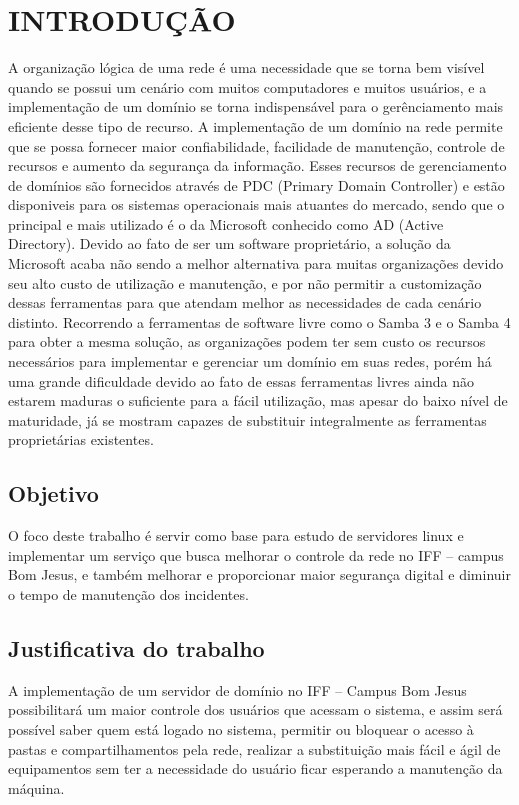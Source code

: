 \chapter{INTRODUÇÃO}

A organização lógica de uma rede é uma necessidade que se torna bem visível quando se possui um cenário com muitos computadores e muitos usuários, e a implementação de um domínio se torna indispensável para o gerênciamento mais eficiente desse tipo de recurso. A implementação de um domínio na rede permite que se possa fornecer maior confiabilidade, facilidade de manutenção, controle de recursos e aumento da segurança da informação.
Esses recursos de gerenciamento de domínios são fornecidos através de PDC (Primary Domain Controller) e estão disponiveis para os sistemas operacionais mais atuantes do mercado, sendo que o principal e mais utilizado é o da Microsoft conhecido como AD (Active Directory).
Devido ao fato de ser um software proprietário, a solução da Microsoft acaba não sendo a melhor alternativa para muitas organizações devido seu alto custo de utilização e manutenção, e por não permitir a customização dessas ferramentas para que atendam melhor as necessidades de cada cenário distinto.
Recorrendo a ferramentas de software livre como o Samba 3 e o Samba 4 para obter a mesma solução, as organizações podem ter sem custo os recursos necessários para implementar e gerenciar um domínio em suas redes, porém há uma grande dificuldade devido ao fato de essas ferramentas livres ainda não estarem maduras o suficiente para a fácil utilização, mas apesar do baixo nível de maturidade, já se mostram capazes de substituir integralmente as ferramentas proprietárias existentes.

\section{Objetivo}

O foco deste trabalho é servir como base para estudo de servidores linux e implementar um serviço que busca melhorar o controle da rede no IFF – campus Bom Jesus, e também melhorar e proporcionar maior segurança digital e diminuir o tempo de manutenção dos incidentes.

\section{Justificativa do trabalho}

A implementação de um servidor de domínio no IFF – Campus Bom Jesus possibilitará um maior controle dos usuários que acessam o sistema, e assim será possível saber quem está logado no sistema, permitir ou bloquear o acesso à pastas e compartilhamentos pela rede, realizar a substituição mais fácil e ágil de equipamentos sem ter a necessidade do usuário ficar esperando a manutenção da máquina.

